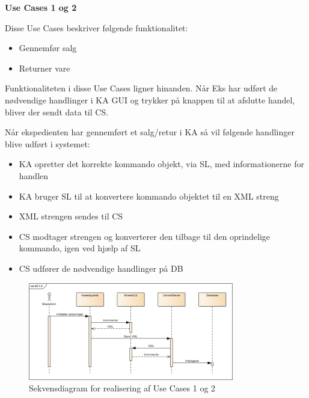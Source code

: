 \textbf{Use Cases 1 og 2}

Disse Use Cases beskriver følgende funktionalitet:
\begin{itemize}
	\item Gennemfør salg
	\item Returner vare
\end{itemize}
Funktionaliteten i disse Use Cases ligner hinanden. Når \gls{Eks} har udført de nødvendige
handlinger i \gls{KA} \gls{GUI} og trykker på knappen til at afslutte handel, bliver der sendt data til \gls{CS}.

Når ekspedienten har gennemført et salg/retur i \gls{KA} så vil følgende
handlinger blive udført i systemet:
\begin{itemize}
	\item \gls{KA} opretter det korrekte kommando objekt, via \gls{SL}, med informationerne for handlen
	\item \gls{KA} bruger \gls{SL} til at konvertere kommando objektet til en XML streng
	\item XML strengen sendes til \gls{CS}
	\item \gls{CS} modtager strengen og konverterer den tilbage til den oprindelige kommando, igen ved hjælp af \gls{SL}
	\item \gls{CS} udfører de nødvendige handlinger på \gls{DB}
\end{itemize}

\begin{figure}[H]
	\centering
	\includegraphics[width=0.8\textwidth]{Systemarkitektur/LogiskView/Realiseringer/Images/UC12.png}
	\caption{Sekvensdiagram for realisering af Use Cases 1 og 2}
	\label{fig:uc38sq}
\end{figure}

